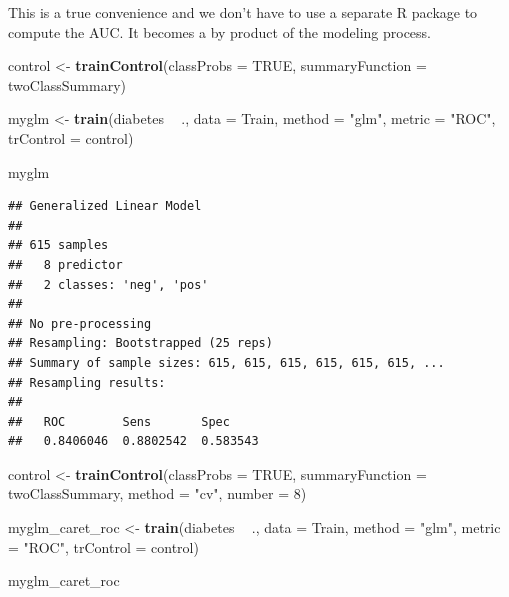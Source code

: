 \documentclass[]{book}
\newenvironment{Shaded}{\begin{snugshade}}{\end{snugshade}}
\newcommand{\KeywordTok}[1]{\textcolor[rgb]{0.13,0.29,0.53}{\textbf{#1}}}
\newcommand{\DataTypeTok}[1]{\textcolor[rgb]{0.13,0.29,0.53}{#1}}
\newcommand{\DecValTok}[1]{\textcolor[rgb]{0.00,0.00,0.81}{#1}}
\newcommand{\StringTok}[1]{\textcolor[rgb]{0.31,0.60,0.02}{#1}}
\newcommand{\OtherTok}[1]{\textcolor[rgb]{0.56,0.35,0.01}{#1}}
\newcommand{\OperatorTok}[1]{\textcolor[rgb]{0.81,0.36,0.00}{\textbf{#1}}}
\newcommand{\NormalTok}[1]{#1}
\begin{document}
This is a true convenience and we don't have to use a separate R package
to compute the AUC. It becomes a by product of the modeling process.

\begin{Shaded}
\begin{Highlighting}[]
\NormalTok{control <-}\StringTok{ }\KeywordTok{trainControl}\NormalTok{(}\DataTypeTok{classProbs =} \OtherTok{TRUE}\NormalTok{,}
                        \DataTypeTok{summaryFunction =}\NormalTok{ twoClassSummary)}

\NormalTok{myglm <-}\StringTok{ }\KeywordTok{train}\NormalTok{(diabetes }\OperatorTok{~}\StringTok{ }\NormalTok{.,}
               \DataTypeTok{data =}\NormalTok{ Train,}
               \DataTypeTok{method =} \StringTok{"glm"}\NormalTok{,}
               \DataTypeTok{metric =} \StringTok{"ROC"}\NormalTok{,}
               \DataTypeTok{trControl =}\NormalTok{ control)}

\NormalTok{myglm}
\end{Highlighting}
\end{Shaded}

\begin{verbatim}
## Generalized Linear Model 
## 
## 615 samples
##   8 predictor
##   2 classes: 'neg', 'pos' 
## 
## No pre-processing
## Resampling: Bootstrapped (25 reps) 
## Summary of sample sizes: 615, 615, 615, 615, 615, 615, ... 
## Resampling results:
## 
##   ROC        Sens       Spec    
##   0.8406046  0.8802542  0.583543
\end{verbatim}

\begin{Shaded}
\begin{Highlighting}[]
\NormalTok{control <-}\StringTok{ }\KeywordTok{trainControl}\NormalTok{(}\DataTypeTok{classProbs =} \OtherTok{TRUE}\NormalTok{,}
                        \DataTypeTok{summaryFunction =}\NormalTok{ twoClassSummary,}
                        \DataTypeTok{method =} \StringTok{"cv"}\NormalTok{,}
                        \DataTypeTok{number =} \DecValTok{8}\NormalTok{)}

\NormalTok{myglm_caret_roc <-}\StringTok{ }\KeywordTok{train}\NormalTok{(diabetes }\OperatorTok{~}\StringTok{ }\NormalTok{.,}
                         \DataTypeTok{data =}\NormalTok{ Train,}
                         \DataTypeTok{method =} \StringTok{"glm"}\NormalTok{,}
                         \DataTypeTok{metric =} \StringTok{"ROC"}\NormalTok{,}
                         \DataTypeTok{trControl =}\NormalTok{ control)}

\NormalTok{myglm_caret_roc}
\end{Highlighting}
\end{Shaded}
\end{document}
